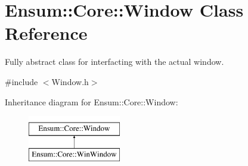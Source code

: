 \hypertarget{class_ensum_1_1_core_1_1_window}{}\section{Ensum\+:\+:Core\+:\+:Window Class Reference}
\label{class_ensum_1_1_core_1_1_window}


Fully abstract class for interfacting with the actual window.  




{\ttfamily \#include $<$Window.\+h$>$}

Inheritance diagram for Ensum\+:\+:Core\+:\+:Window\+:\begin{figure}[H]
\begin{center}
\leavevmode
\includegraphics[height=2.000000cm]{class_ensum_1_1_core_1_1_window}
\end{center}
\end{figure}
